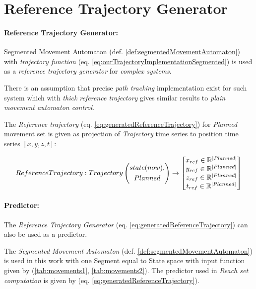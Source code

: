 \section{Reference Trajectory Generator}\label{s:referenceTrajectoryGenerator}

\paragraph{Reference Trajectory Generator:} Segmented Movement Automaton (def.  \ref{def:segmentedMovementAutomaton}) with \emph{trajectory function} (eq. \ref{eq:ourTrajectoryImplementationSegmented}) is used as a \emph{reference trajectory generator} for \emph{complex systems}. 

There is an assumption that precise \emph{path tracking} implementation exist for such system which with \emph{thick reference trajectory} gives similar results to \emph{plain movement automaton control}.

The \emph{Reference trajectory} (eq. \ref{eq:generatedReferenceTrajectory}) for \emph{Planned} movement set is given as projection  of \emph{Trajectory} time series to position time series $[x,y,z,t]$:

\begin{equation}\label{eq:generatedReferenceTrajectory}
    Reference Trajectory:Trajectory\left(\begin{gathered}state(now),\\Planned\end{gathered}\right) 
    \to 
    \begin{bmatrix}
        x_{ref} \in \mathbb{R}^{|Planned|}\\
        y_{ref} \in \mathbb{R}^{|Planned|}\\
        z_{ref} \in \mathbb{R}^{|Planned|}\\
        t_{ref} \in \mathbb{R}^{|Planned|}
    \end{bmatrix}
\end{equation}

\paragraph{Predictor:} The \emph{Reference Trajectory Generator} (eq. \ref{eq:generatedReferenceTrajectory}) can also be used as a predictor. 

\begin{note}
    The \emph{Segmented Movement Automaton} (def. \ref{def:segmentedMovementAutomaton}) is used in this work with one Segment equal to State space with input function given by (\ref{tab:movements1}, \ref{tab:movements2}). The predictor used in \emph{Reach set computation} is given by (eq. \ref{eq:generatedReferenceTrajectory}).
\end{note}

